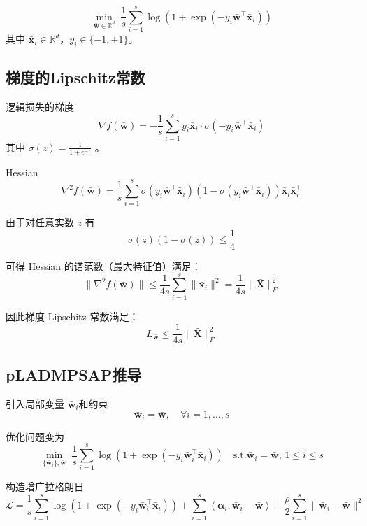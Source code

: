 \documentclass{homework}
\begin{document}
\question

\begin{sol}
    \[
\min_{\bar{\mathbf{w}} \in \mathbb{R}^d} \; \frac{1}{s} \sum_{i=1}^{s} \log\left(1 + \exp(-y_i \bar{\mathbf{w}}^\top \bar{\mathbf{x}}_i)\right)
\]
其中 $\bar{\mathbf{x}}_i \in \mathbb{R}^d$，$y_i \in \{-1, +1\}$。

\subsection*{梯度的Lipschitz常数}

逻辑损失的梯度
\[
\nabla f(\bar{\mathbf{w}}) = -\frac{1}{s} \sum_{i=1}^{s} y_i \bar{\mathbf{x}}_i \cdot \sigma(-y_i \bar{\mathbf{w}}^\top \bar{\mathbf{x}}_i)
\]
其中 $\sigma(z) = \frac{1}{1 + e^{-z}}$ 。

Hessian
\[
\nabla^2 f(\bar{\mathbf{w}}) = \frac{1}{s} \sum_{i=1}^s \sigma(y_i \bar{\mathbf{w}}^\top \bar{\mathbf{x}}_i)\left(1 - \sigma(y_i \bar{\mathbf{w}}^\top \bar{\mathbf{x}}_i)\right) \bar{\mathbf{x}}_i \bar{\mathbf{x}}_i^\top
\]

由于对任意实数 $z$ 有
\[
\sigma(z)(1 - \sigma(z)) \leq \frac{1}{4}
\]

可得 Hessian 的谱范数（最大特征值）满足：
\[
\|\nabla^2 f(\bar{\mathbf{w}})\| \leq \frac{1}{4s} \sum_{i=1}^s \|\bar{\mathbf{x}}_i\|^2 = \frac{1}{4s} \|\bar{\mathbf{X}}\|_F^2
\]

因此梯度 Lipschitz 常数满足：
\[
L_{\bar{\mathbf{w}}} \leq \frac{1}{4s} \|\bar{\mathbf{X}}\|_F^2
\]

\subsection*{pLADMPSAP推导}

引入局部变量 $\bar{\mathbf{w}}_i$和约束
\[
\bar{\mathbf{w}}_i = \bar{\mathbf{w}}, \quad \forall i=1,\dots,s
\]

优化问题变为
\[
\min_{\{\bar{\mathbf{w}}_i\}, \bar{\mathbf{w}}} \; \frac{1}{s} \sum_{i=1}^s \log\left(1 + \exp(-y_i \bar{\mathbf{w}}_i^\top \bar{\mathbf{x}}_i)\right) \quad \text{s.t.} \bar{\mathbf{w}}_i = \bar{\mathbf{w}},\, 1\le i \le s
\]

构造增广拉格朗日
\[
\mathcal{L} = \frac{1}{s} \sum_{i=1}^s \log\left(1 + \exp(-y_i \bar{\mathbf{w}}_i^\top \bar{\mathbf{x}}_i)\right) + \sum_{i=1}^s \left\langle \bm{\alpha}_i, \bar{\mathbf{w}}_i - \bar{\mathbf{w}} \right\rangle + \frac{\rho}{2} \sum_{i=1}^s \|\bar{\mathbf{w}}_i - \bar{\mathbf{w}}\|^2
\]


\end{sol}
\end{document}
